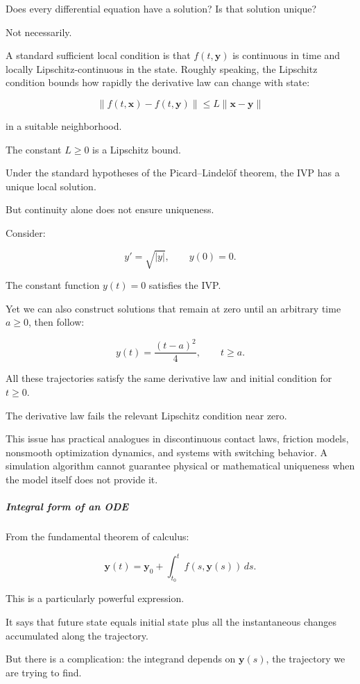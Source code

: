 Does every differential equation have a solution? Is that solution unique?

Not necessarily.

A standard sufficient local condition is that \(f(t,\mathbf y)\) is continuous in time and locally Lipschitz-continuous in the state. Roughly speaking, the Lipschitz condition bounds how rapidly the derivative law can change with state:

\[
\|f(t,\mathbf x)-f(t,\mathbf y)\| \le L\|\mathbf x-\mathbf y\|
\]

in a suitable neighborhood.

The constant \(L\ge0\) is a Lipschitz bound.

Under the standard hypotheses of the Picard--Lindelöf theorem, the IVP has a unique local solution.

But continuity alone does not ensure uniqueness.

Consider:

\[
y'=\sqrt{|y|}, \qquad y(0)=0.
\]

The constant function \(y(t)=0\) satisfies the IVP.

Yet we can also construct solutions that remain at zero until an arbitrary time \(a\ge0\), then follow:

\[
y(t)=\frac{(t-a)^2}{4}, \qquad t\ge a.
\]

All these trajectories satisfy the same derivative law and initial condition for \(t\ge0\).

The derivative law fails the relevant Lipschitz condition near zero.

This issue has practical analogues in discontinuous contact laws, friction models, nonsmooth optimization dynamics, and systems with switching behavior. A simulation algorithm cannot guarantee physical or mathematical uniqueness when the model itself does not provide it.

\subparagraph{Integral form of an ODE}\label{integral-form-of-an-ode}

From the fundamental theorem of calculus:

\[
\boxed{ \mathbf y(t) = \mathbf y_0+ \int_{t_0}^{t}f(s,\mathbf y(s))\,ds }.
\]

This is a particularly powerful expression.

It says that future state equals initial state plus all the instantaneous changes accumulated along the trajectory.

But there is a complication: the integrand depends on \(\mathbf y(s)\), the trajectory we are trying to find.

